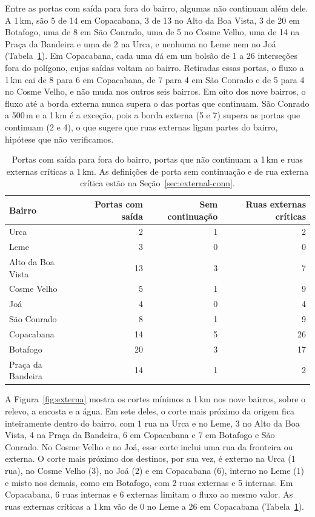 Entre as portas com saída para fora do bairro, algumas não continuam além
dele. A 1\,km, são 5 de 14 em Copacabana, 3 de 13 no Alto da Boa Vista, 3 de
20 em Botafogo, uma de 8 em São Conrado, uma de 5 no Cosme Velho, uma de 14 na
Praça da Bandeira e uma de 2 na Urca, e nenhuma no Leme nem no Joá
(Tabela~\ref{tab:portas}). Em Copacabana, cada uma dá em um bolsão de 1 a 26
interseções fora do polígono, cujas saídas voltam ao bairro. Retiradas essas
portas, o fluxo a 1\,km cai de 8 para 6 em Copacabana, de 7 para 4 em São
Conrado e de 5 para 4 no Cosme Velho, e não muda nos outros seis bairros. Em
oito dos nove bairros, o fluxo até a borda externa nunca supera o das portas
que continuam. São Conrado a 500\,m e a 1\,km é a exceção, pois a borda
externa (5 e 7) supera as portas que continuam (2 e 4), o que sugere que ruas
externas ligam partes do bairro, hipótese que não verificamos.

\begin{table}[tbp]
\centering
\caption{Portas com saída para fora do bairro, portas que não continuam a
1\,km e ruas externas críticas a 1\,km. As definições de porta sem continuação
e de rua externa crítica estão na Seção~\ref{sec:external-conn}.}
\label{tab:portas}
\small
\begin{tabular}{lrrr}
\toprule
Bairro & Portas com saída & Sem continuação & Ruas externas críticas \\
\midrule
Urca              &  2 & 1 &  2 \\
Leme              &  3 & 0 &  0 \\
Alto da Boa Vista & 13 & 3 &  7 \\
Cosme Velho       &  5 & 1 &  9 \\
Joá               &  4 & 0 &  4 \\
São Conrado       &  8 & 1 &  9 \\
Copacabana        & 14 & 5 & 26 \\
Botafogo          & 20 & 3 & 17 \\
Praça da Bandeira & 14 & 1 &  2 \\
\bottomrule
\end{tabular}
\end{table}

A Figura~\ref{fig:externa} mostra os cortes mínimos a 1\,km nos nove bairros,
sobre o relevo, a encosta e a água. Em sete deles, o corte mais próximo da
origem fica inteiramente dentro do bairro, com 1 rua na Urca e no Leme, 3 no
Alto da Boa Vista, 4 na Praça da Bandeira, 6 em Copacabana e 7 em Botafogo e
São Conrado. No Cosme Velho e no Joá, esse corte inclui uma rua da fronteira ou
externa. O corte mais próximo dos destinos, por sua vez, é externo na Urca (1
rua), no Cosme Velho (3), no Joá (2) e em Copacabana (6), interno no Leme (1) e
misto nos demais, como em Botafogo, com 2 ruas externas e 5 internas. Em
Copacabana, 6 ruas internas e 6 externas limitam o fluxo ao mesmo valor. As
ruas externas críticas a 1\,km vão de 0 no Leme a 26 em Copacabana
(Tabela~\ref{tab:portas}).

